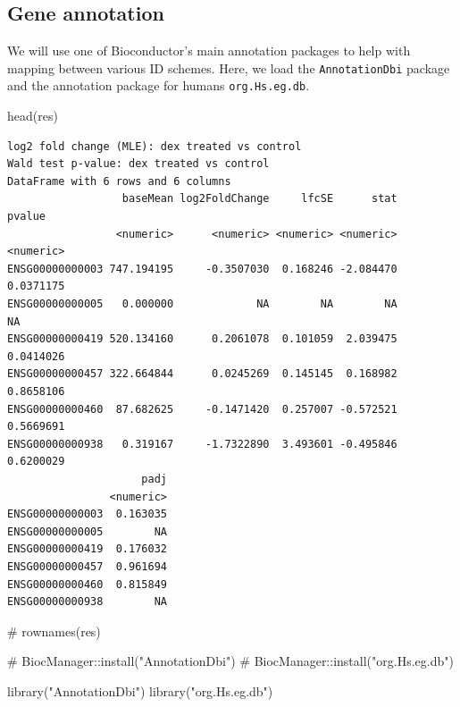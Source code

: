 \documentclass[
  letterpaper,
  DIV=11,
  numbers=noendperiod]{scrartcl}
\newenvironment{Shaded}{\begin{snugshade}}{\end{snugshade}}
\newcommand{\CommentTok}[1]{\textcolor[rgb]{0.37,0.37,0.37}{#1}}
\newcommand{\FunctionTok}[1]{\textcolor[rgb]{0.28,0.35,0.67}{#1}}
\newcommand{\NormalTok}[1]{\textcolor[rgb]{0.00,0.23,0.31}{#1}}
\newcommand{\StringTok}[1]{\textcolor[rgb]{0.13,0.47,0.30}{#1}}
\begin{document}
\hypertarget{gene-annotation}{%
\subsection{Gene annotation}\label{gene-annotation}}

We will use one of Bioconductor's main annotation packages to help with
mapping between various ID schemes. Here, we load the
\texttt{AnnotationDbi} package and the annotation package for humans
\texttt{org.Hs.eg.db}.

\begin{Shaded}
\begin{Highlighting}[]
\FunctionTok{head}\NormalTok{(res)}
\end{Highlighting}
\end{Shaded}

\begin{verbatim}
log2 fold change (MLE): dex treated vs control 
Wald test p-value: dex treated vs control 
DataFrame with 6 rows and 6 columns
                  baseMean log2FoldChange     lfcSE      stat    pvalue
                 <numeric>      <numeric> <numeric> <numeric> <numeric>
ENSG00000000003 747.194195     -0.3507030  0.168246 -2.084470 0.0371175
ENSG00000000005   0.000000             NA        NA        NA        NA
ENSG00000000419 520.134160      0.2061078  0.101059  2.039475 0.0414026
ENSG00000000457 322.664844      0.0245269  0.145145  0.168982 0.8658106
ENSG00000000460  87.682625     -0.1471420  0.257007 -0.572521 0.5669691
ENSG00000000938   0.319167     -1.7322890  3.493601 -0.495846 0.6200029
                     padj
                <numeric>
ENSG00000000003  0.163035
ENSG00000000005        NA
ENSG00000000419  0.176032
ENSG00000000457  0.961694
ENSG00000000460  0.815849
ENSG00000000938        NA
\end{verbatim}

\begin{Shaded}
\begin{Highlighting}[]
\CommentTok{\# rownames(res)}
\end{Highlighting}
\end{Shaded}

\begin{Shaded}
\begin{Highlighting}[]
\CommentTok{\# BiocManager::install("AnnotationDbi")}
\CommentTok{\# BiocManager::install("org.Hs.eg.db")}

\FunctionTok{library}\NormalTok{(}\StringTok{"AnnotationDbi"}\NormalTok{)}
\FunctionTok{library}\NormalTok{(}\StringTok{"org.Hs.eg.db"}\NormalTok{)}
\end{Highlighting}
\end{Shaded}
\end{document}
